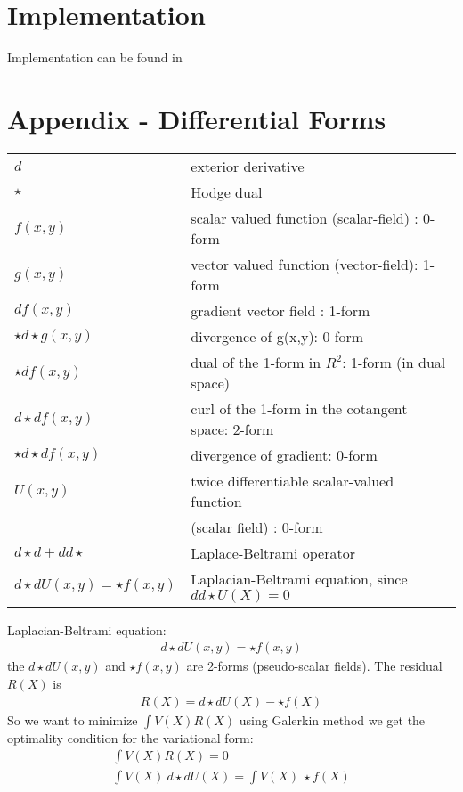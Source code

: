 \documentclass{birkjour}
\numberwithin{equation}{section}
\begin{document}
\section{Implementation}

Implementation can be found in \cite{Basic2DHeatEquationFEM}

\section{Appendix - Differential Forms}

\newcommand{\hodge}{{\star}}

\begin{tabular}{l l}
	$d$ & exterior derivative\\
	$\hodge$ & Hodge dual\\
	$f(x,y)$ & scalar valued function (scalar-field) : 0-form\\
	$g(x,y)$ & vector valued function (vector-field): 1-form\\
	$df(x,y)$ & gradient vector field : 1-form\\
	$\hodge d \hodge g(x,y)$ & divergence  of  g(x,y): 0-form\\
	$\hodge df(x,y)$ & dual  of  the  1-form  in  $R^2$:  1-form (in dual space)\\
	$d \hodge df(x,y)$ & curl of the 1-form in the cotangent space: 2-form\\
	$\hodge d \hodge df(x,y)$ & divergence of gradient: 0-form\\
	$U(x,y)$ & twice differentiable scalar-valued function\\ & (scalar field) : 0-form\\
	$d \hodge d + d d \hodge$ & Laplace-Beltrami operator\\
	$d \hodge d U(x,y) = \hodge f(x, y)$ & Laplacian-Beltrami equation, since $dd\hodge U(X) = 0$ \\
\end{tabular}

Laplacian-Beltrami equation:
\begin{eqnarray} 
	d \hodge d U(x,y) = \hodge f(x, y) \nonumber
\end{eqnarray} 
the $d \hodge d U(x,y)$ and $\hodge f(x, y)$ are 2-forms (pseudo-scalar fields). The residual $R(X)$ is
\begin{eqnarray} 
	R(X) = d \hodge d U(X) - \hodge f(X) \nonumber
\end{eqnarray} 
So we want to minimize $\int V(X) R(X)$ using Galerkin method we get the optimality condition for the variational form:
\begin{eqnarray} 
\int V(X) R(X) = 0 \nonumber\\
\int V(X) \ d \hodge d U(X) = \int V(X) \ \hodge f(X) \nonumber
\end{eqnarray} 
\end{document}

